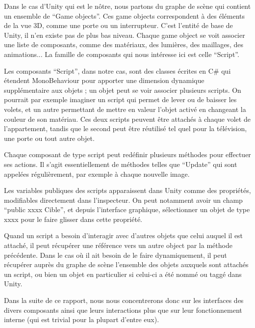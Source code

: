 Dans le cas d'Unity qui est le nôtre, nous partons du graphe de scène qui contient un ensemble de \enquote{Game objects}. Ces game objects correspondent à des éléments de la vue 3D, comme une porte ou un interrupteur. C'est l'entité de base de Unity, il n'en existe pas de plus bas niveau. Chaque game object se voit associer une liste de composants, comme des matériaux, des lumières, des maillages, des animations... La famille de composants qui nous intéresse ici est celle \enquote{Script}.\newline

Les composants \enquote{Script}, dans notre cas, sont des classes écrites en C\# qui étendent MonoBehaviour pour apporter une dimension dynamique supplémentaire aux objets ; un objet peut se voir associer plusieurs scripts. On pourrait par exemple imaginer un script qui permet de lever ou de baisser les volets, et un autre permettant de mettre en valeur l'objet activé en changeant la couleur de son matériau. Ces deux scripts peuvent être attachés à chaque volet de l'appartement, tandis que le second peut être réutilisé tel quel pour la télévision, une porte ou tout autre objet.\newline

Chaque composant de type script peut redéfinir plusieurs méthodes pour effectuer ses actions. Il s'agit essentiellement de méthodes telles que \enquote{Update} qui sont appelées régulièrement, par exemple à chaque nouvelle image.\newline

Les variables publiques des scripts apparaissent dans Unity comme des propriétés, modifiables directement dans l'inspecteur. On peut notamment avoir un champ \enquote{public xxxx Cible}, et depuis l'interface graphique, sélectionner un objet de type xxxx pour le faire glisser dans cette propriété.\newline

Quand un script a besoin d'interagir avec d'autres objets que celui auquel il est attaché, il peut récupérer une référence vers un autre  object par la méthode précédente. Dans le cas où il ait besoin de le faire dynamiquement, il peut récupérer auprès du graphe de scène l'ensemble des objets auxquels sont attachés un script, ou bien un objet en particulier si celui-ci a été nommé ou taggé dans Unity.\newline

Dans la suite de ce rapport, nous nous concentrerons donc sur les interfaces des divers composants ainsi que leurs interactions plus que sur leur fonctionnement interne (qui est trivial pour la plupart d'entre eux).\newline